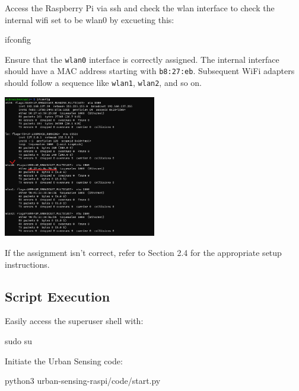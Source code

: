 \documentclass[
  letterpaper,
]{scrbook}
\newenvironment{Shaded}{\begin{snugshade}}{\end{snugshade}}
\newcommand{\ExtensionTok}[1]{\textcolor[rgb]{0.00,0.23,0.31}{#1}}
\newcommand{\FunctionTok}[1]{\textcolor[rgb]{0.28,0.35,0.67}{#1}}
\newcommand{\NormalTok}[1]{\textcolor[rgb]{0.00,0.23,0.31}{#1}}
\begin{document}
Access the Raspberry Pi via ssh and check the wlan interface to check
the internal wifi set to be wlan0 by excueting this:

\begin{Shaded}
\begin{Highlighting}[]
\ExtensionTok{ifconfig}
\end{Highlighting}
\end{Shaded}

Ensure that the \texttt{wlan0} interface is correctly assigned. The
internal interface should have a MAC address starting with
\texttt{b8:27:eb}. Subsequent WiFi adapters should follow a sequence
like \texttt{wlan1}, \texttt{wlan2}, and so on.

\includegraphics[width=0.5\textwidth,height=\textheight]{content/material/ch2/ifconfig_wlan_check.png}

If the assignment isn't correct, refer to Section 2.4 for the
appropriate setup instructions.

\subsection{Script Execution}\label{script-execution}

Easily access the superuser shell with:

\begin{Shaded}
\begin{Highlighting}[]
\FunctionTok{sudo}\NormalTok{ su}
\end{Highlighting}
\end{Shaded}

Initiate the Urban Sensing code:

\begin{Shaded}
\begin{Highlighting}[]
\ExtensionTok{python3}\NormalTok{ urban{-}sensing{-}raspi/code/start.py}
\end{Highlighting}
\end{Shaded}
\end{document}

